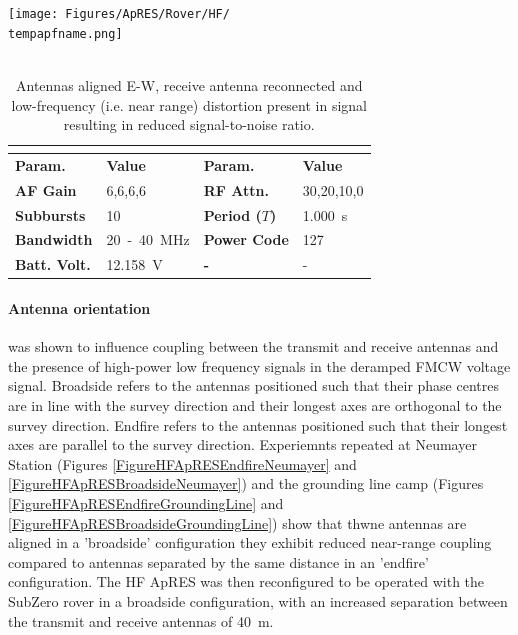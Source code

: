 \documentclass[a4paper,12pt]{article}
\newcommand{\apresdoc}[9]{
    \def\tempapfname{#1}
    \def\tempaploc{#2}
    \def\tempapcom{#3}
    \def\temptimestamp{#4}
    \def\tempafgain{#5}
    \def\temprfattn{#6}
    \def\tempperiod{#7}
    \def\tempflow{#8}
    \def\tempfupp{#9}
    \apresdoccont
}
\newcommand{\apresdoccont}[6]{
  \def\tempnatt{#1}
  \def\tempnchirp{#2}
  \def\tempnsubburst{#3}
  \def\temppowercode{#4}
  \def\tempbattvolt{#5}
  \def\tempaplbl{#6}

  \begin{table}
    \caption{\tempapcom}
    \rowcolors{2}{gray!25}{white}
    \centering
    \texttt{[image: Figures/ApRES/Rover/HF/\\tempapfname.png]}
    \\
    ~\\
    \begin{tabular}{>{\bfseries}l l >{\bfseries}l l}
      \hline
      \rowcolor{gray!50}
      \multicolumn{4}{c}{\textbf{Filename} \tempapfname} \\
      \hline
      Param. & \bfseries Value & Param. & \bfseries Value \\
      AF Gain & \tempafgain &
      RF Attn. & \temprfattn \\
      Subbursts & \tempnsubburst &
      Period ($T$) & \tempperiod~s \\
      Bandwidth & \tempflow~-~\tempfupp~MHz &
      Power Code & \temppowercode \\
      Batt. Volt. & \tempbattvolt~V &
      - & - \\
      \hline
    \end{tabular}
    \label{\tempaplbl}
  \end{table}
}
\begin{document}
\apresdoc
{2021-12-28\_214326.dat}
{Neumayer III}
{Antennas aligned E-W, receive antenna reconnected and low-frequency (i.e. near
range) distortion present in signal resulting in reduced signal-to-noise ratio.}
{2021-12-28 21:43:26.000}
{6,6,6,6}
{30,20,10,0}
{1.000}
{20}
{40}
{4}
{40}
{10}
{127}
{12.158}
{FigureHFApRESReconnectedAntenna}

\paragraph*{Antenna orientation} was shown to influence coupling between
the transmit and receive antennas and the presence of high-power low frequency
signals in the deramped FMCW voltage signal.  Broadside refers to the antennas
positioned such that their phase centres are in line with the survey direction
and their longest axes are orthogonal to the survey direction.  Endfire refers
to the antennas positioned such that their longest axes are parallel to the
survey direction.  Experiemnts repeated at Neumayer Station (Figures
\ref{FigureHFApRESEndfireNeumayer} and \ref{FigureHFApRESBroadsideNeumayer}) and
the grounding line camp (Figures \ref{FigureHFApRESEndfireGroundingLine} and
\ref{FigureHFApRESBroadsideGroundingLine}) show that thwne antennas are aligned
in a 'broadside' configuration they exhibit reduced near-range coupling compared
to antennas separated by the same distance in an 'endfire' configuration.  The
HF ApRES was then reconfigured to be operated with the SubZero rover in a
broadside configuration, with an increased separation between the transmit and
receive antennas of \SI{40}{\metre}.
\end{document}
